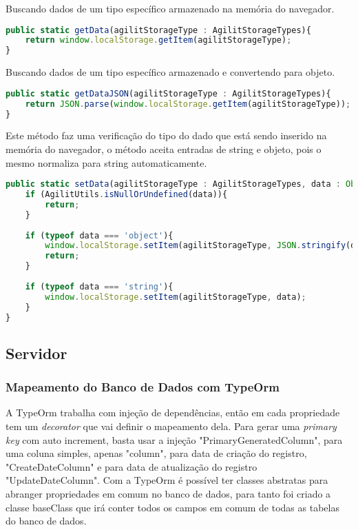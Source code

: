 Buscando dados de um tipo específico armazenado na memória do navegador.

\begin{lstlisting}[language=JavaScript, caption={Buscar em formato de STRING}]
public static getData(agilitStorageType : AgilitStorageTypes){   
	return window.localStorage.getItem(agilitStorageType);
}
\end{lstlisting}

Buscando dados de um tipo específico armazenado e convertendo para objeto.

\begin{lstlisting}[language=JavaScript, caption={Buscar em formato JSON}]
public static getDataJSON(agilitStorageType : AgilitStorageTypes){    
	return JSON.parse(window.localStorage.getItem(agilitStorageType));
}
\end{lstlisting}

Este método faz uma verificação do tipo do dado que está sendo inserido na memória do navegador, o método aceita entradas de string e objeto, pois o mesmo normaliza para string automaticamente.

\begin{lstlisting}[language=JavaScript, caption={Inserindo dados na memória do navegador}]
public static setData(agilitStorageType : AgilitStorageTypes, data : Object|Array<any>|string){
	if (AgilitUtils.isNullOrUndefined(data)){
		return;
	}
	
	if (typeof data === 'object'){
		window.localStorage.setItem(agilitStorageType, JSON.stringify(data));
		return;
	}
	
	if (typeof data === 'string'){
		window.localStorage.setItem(agilitStorageType, data);
	}    
}
\end{lstlisting}

\subsection{Servidor}
\subsubsection{Mapeamento do Banco de Dados com TypeOrm}

A TypeOrm trabalha com injeção de dependências, então em cada propriedade tem um \textit{decorator} que vai definir o mapeamento dela. Para gerar uma \textit{primary key} com auto increment, basta usar a injeção "PrimaryGeneratedColumn", para uma coluna simples, apenas "column", para data de criação do registro, "CreateDateColumn" e para data de atualização do registro "UpdateDateColumn".
Com a TypeOrm é possível ter classes abstratas para abranger propriedades em comum no banco de dados, para tanto foi criado a classe baseClass que irá conter todos os campos em comum de todas as tabelas do banco de dados.

